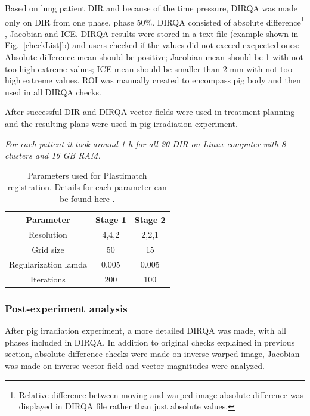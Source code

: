 \documentclass[type=dr, dr=rernat, accentcolor=tud7b,colorbacktitle, bigchapter, openright, twoside, 12pt ]{tudthesis}
\begin{document}
Based on lung patient DIR and because of the time pressure, DIRQA was made only on DIR from one phase, phase 50\%. DIRQA consisted of absolute difference\footnote{Relative difference between moving and warped image absolute difference was displayed in DIRQA file rather than just absolute values.} 
, Jacobian and ICE. DIRQA results were stored in a text file (example shown in Fig.~\ref{checkList}b) and users checked if the values did not exceed excpected ones: Absolute difference
mean should be positive; Jacobian mean should be 1 with not too high extreme values; ICE mean should be smaller than 2 mm with not too high extreme values. ROI was manually created to encompass pig body and then used in all DIRQA checks.

After successful DIR and DIRQA vector fields were used in treatment planning and the resulting plans were used in pig irradiation experiment.

\textit{For each patient it took around 1 h for all 20 DIR on Linux computer with 8 clusters and 16 GB RAM.}

\begin{table}[H]
  \centering
  \caption{Parameters used for Plastimatch registration. Details for each parameter can be found here \cite{Plastimatch}.}
  \begin{tabular}{c|c|c}
      Parameter & Stage 1 & Stage 2 \\
      \hline
      Resolution & 4,4,2 & 2,2,1 \\
      Grid size & 50 & 15 \\
      Regularization lamda & 0.005 & 0.005 \\
      Iterations & 200 & 100 \\
    \hline\hline
  \end{tabular}
  \label{tab:stages2}
\end{table}

\subsubsection{Post-experiment analysis}

After pig irradiation experiment, a more detailed DIRQA was made, with all phases included in DIRQA. In addition to original checks explained in previous section, absolute difference checks were made on inverse warped image, 
Jacobian was made on inverse vector field and vector magnitudes were analyzed.
\end{document}
